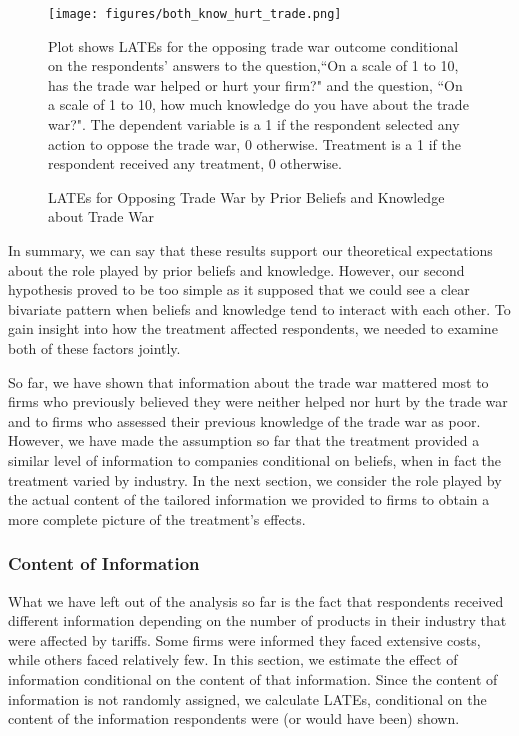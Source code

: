 \documentclass{article}
\begin{document}
\begin{figure}
    \centering
    \texttt{[image: figures/both\_know\_hurt\_trade.png]}
    
    \raggedright \scriptsize Plot shows LATEs for the opposing trade war outcome conditional on the respondents' answers to the question,``On a scale of 1 to 10, has the trade war helped or hurt your firm?" and the question, ``On a scale of 1 to 10, how much knowledge do you have about the trade war?". The dependent variable is a 1 if the respondent selected any action to oppose the trade war, 0 otherwise. Treatment is a 1 if the respondent received any treatment, 0 otherwise.
    \caption{LATEs for Opposing Trade War by Prior Beliefs and Knowledge about Trade War}
    \label{fulldist}
\end{figure}

In summary, we can say that these results support our theoretical expectations about the role played by prior beliefs and knowledge. However, our second hypothesis proved to be too simple as it supposed that we could see a clear bivariate pattern when beliefs and knowledge tend to interact with each other. To gain insight into how the treatment affected respondents, we needed to examine both of these factors jointly.

So far, we have shown that information about the trade war mattered most to firms who previously believed they were neither helped nor hurt by the trade war and to firms who assessed their previous knowledge of the trade war as poor. However, we have made the assumption so far that the treatment provided a similar level of information to companies conditional on beliefs, when in fact the treatment varied by industry. In the next section, we consider the role played by the actual content of the tailored information we provided to firms to obtain a more complete picture of the treatment's effects.

\subsubsection{Content of Information}

What we have left out of the analysis so far is the fact that respondents received different information depending on the number of products in their industry that were affected by tariffs. Some firms were informed they faced extensive costs, while others faced relatively few. In this section, we estimate the effect of information conditional on the content of that information. Since the content of information is not randomly assigned, we calculate LATEs, conditional on the content of the information respondents were (or would have been) shown.
\end{document}

